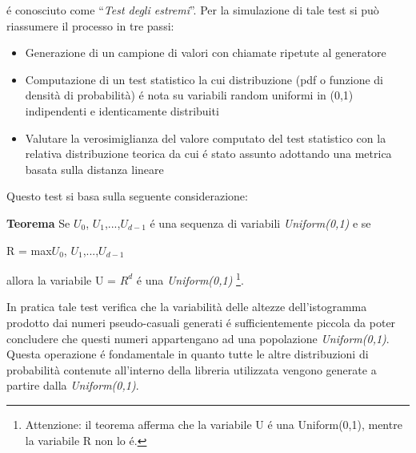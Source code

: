 \noindent \'e conosciuto come ``\textit{Test degli estremi}''. 
Per la simulazione di tale test si pu\`o riassumere il processo in tre passi:
\begin{itemize}
 \item Generazione di un campione di valori con chiamate ripetute al generatore
 \item Computazione di un test statistico la cui distribuzione (pdf o funzione 
di densit\`a di probabilit\`a) \'e nota su variabili random uniformi in (0,1) indipendenti e identicamente 
distribuiti
 \item Valutare la verosimiglianza del valore computato del test statistico con 
la relativa distribuzione
 teorica da cui \'e stato assunto adottando una metrica basata sulla distanza 
lineare
\end{itemize}

Questo test si basa sulla seguente considerazione:

\vspace{0.5cm} \noindent \textbf{Teorema} Se $U_{0}^{}$, 
$U_{1}^{}$,...,$U_{d-1}^{}$ \'e una sequenza di variabili \textit{Uniform(0,1)} e 
se 

\begin{center}R = max{$U_{0}^{}$, $U_{1}^{}$,...,$U_{d-1}^{}$} \end{center} 

\noindent allora la variabile U = $R_{}^{d}$ \'e una \textit{Uniform(0,1)} 
\footnote{Attenzione: il teorema afferma che la variabile U \'e una Uniform(0,1), 
mentre la variabile R non lo \'e.}.

In pratica tale test verifica che la variabilit\`a delle altezze dell'istogramma 
prodotto dai numeri pseudo-casuali generati \'e sufficientemente piccola da poter 
concludere che questi numeri appartengano ad una popolazione 
\textit{Uniform(0,1)}. Questa operazione \'e fondamentale in quanto tutte le 
altre distribuzioni di probabilit\`a contenute all'interno della libreria 
utilizzata vengono generate a partire dalla \textit{Uniform(0,1)}.

